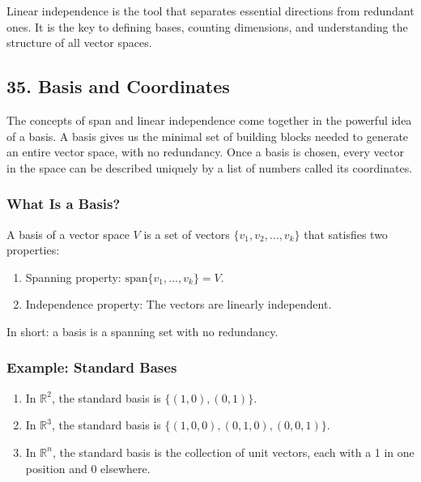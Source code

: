 \documentclass[
  letterpaper,
  DIV=11,
  numbers=noendperiod]{scrreprt}
\providecommand{\tightlist}{%
  \setlength{\itemsep}{0pt}\setlength{\parskip}{0pt}}
\begin{document}
Linear independence is the tool that separates essential directions from
redundant ones. It is the key to defining bases, counting dimensions,
and understanding the structure of all vector spaces.

\subsection{35. Basis and Coordinates}\label{basis-and-coordinates}

The concepts of span and linear independence come together in the
powerful idea of a basis. A basis gives us the minimal set of building
blocks needed to generate an entire vector space, with no redundancy.
Once a basis is chosen, every vector in the space can be described
uniquely by a list of numbers called its coordinates.

\subsubsection{What Is a Basis?}\label{what-is-a-basis}

A basis of a vector space \(V\) is a set of vectors
\(\{v_1, v_2, \dots, v_k\}\) that satisfies two properties:

\begin{enumerate}
\def\labelenumi{\arabic{enumi}.}
\tightlist
\item
  Spanning property: \(\text{span}\{v_1, \dots, v_k\} = V\).
\item
  Independence property: The vectors are linearly independent.
\end{enumerate}

In short: a basis is a spanning set with no redundancy.

\subsubsection{Example: Standard Bases}\label{example-standard-bases}

\begin{enumerate}
\def\labelenumi{\arabic{enumi}.}
\tightlist
\item
  In \(\mathbb{R}^2\), the standard basis is \(\{(1,0), (0,1)\}\).
\item
  In \(\mathbb{R}^3\), the standard basis is
  \(\{(1,0,0), (0,1,0), (0,0,1)\}\).
\item
  In \(\mathbb{R}^n\), the standard basis is the collection of unit
  vectors, each with a 1 in one position and 0 elsewhere.
\end{enumerate}
\end{document}
